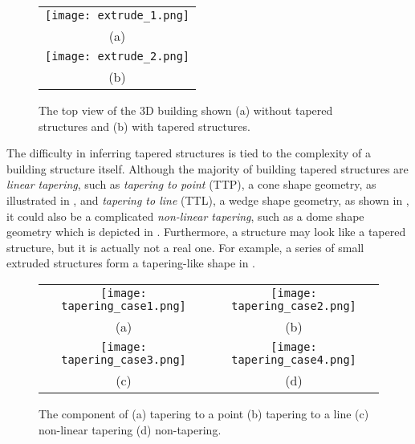 \begin{figure}[htbp]
\begin{center}
\begin{tabular}{c}
\texttt{[image: extrude\_1.png]} \\
(a) \\
\texttt{[image: extrude\_2.png]} \\
(b)
\end{tabular}
\end{center}
\caption{The top view of the 3D building shown (a) without tapered structures
and (b) with tapered structures.}
\label{fig:DXF_top}
\end{figure}

The difficulty in inferring tapered structures is tied to
the complexity of a building structure itself.
Although the majority of building tapered structures are
{\it linear tapering},
such as {\it tapering to point} (TTP), a cone shape geometry,
as illustrated in ,
and {\it tapering to line} (TTL), a wedge shape geometry,
as shown in ,
it could also be a complicated {\it non-linear tapering},
such as a dome shape geometry which is depicted in .
Furthermore, a structure may look like a tapered structure,
but it is actually not a real one.
For example, a series of small extruded structures
form a tapering-like shape in .


\begin{figure}[htbp]
\begin{center}
\begin{tabular}{cc}
\texttt{[image: tapering\_case1.png]} &
\texttt{[image: tapering\_case2.png]} \\
(a) & (b) \\
\texttt{[image: tapering\_case3.png]} &
\texttt{[image: tapering\_case4.png]} \\
(c) & (d)
\end{tabular}
\end{center}
\caption{The component of (a) tapering to a point (b) tapering to a line
(c) non-linear tapering (d) non-tapering. }
\label{fig:taper_cases}
\end{figure}

